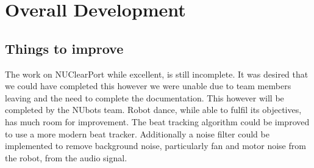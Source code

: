 \documentclass[english,12pt]{scrartcl}
\begin{document}
\section{Overall Development}
	\subsection{Things to improve}
		The work on NUClearPort while excellent, is still incomplete.
		It was desired that we could have completed this however we were unable due to team members leaving and the need to complete the documentation.
		This however will be completed by the NUbots team.
		Robot dance, while able to fulfil its objectives, has much room for improvement.
		The beat tracking algorithm could be improved to use a more modern beat tracker.
		Additionally a noise filter could be implemented to remove background noise, particularly fan and motor noise from the robot, from the audio signal.
	
\end{document}
